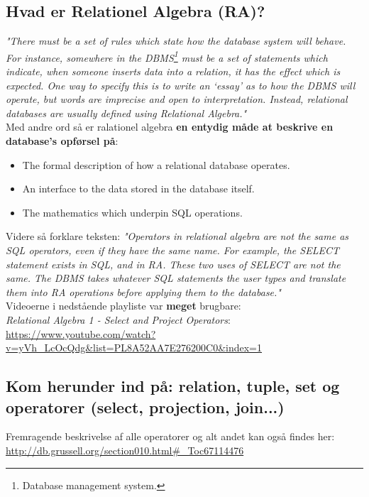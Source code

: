 \newpage

\subsection{Hvad er Relationel Algebra (RA)?}

\textit{"There must be a set of rules which state how the database system will behave. For instance, somewhere in the DBMS\footnote{Database management system.} must be a set of statements which indicate, when someone inserts data into a relation, it has the effect which is expected. One way to specify this is to write an `essay' as to how the DBMS will operate, but words are imprecise and open to interpretation. Instead, relational databases are usually defined using Relational Algebra."}\\

Med andre ord så er ralationel algebra \textbf{en entydig måde at beskrive en database's opførsel på}: 

\begin{itemize}
	\item The formal description of how a relational database operates.
	\item An interface to the data stored in the database itself.
	\item The mathematics which underpin SQL operations.
\end{itemize}

Videre så forklare teksten: \textit{"Operators in relational algebra are not the same as SQL operators, even if they have the same name. For example, the SELECT statement exists in SQL, and in RA. These two uses of SELECT are not the same. The DBMS takes whatever SQL statements the user types and translate them into RA operations before applying them to the database."}\\

Videoerne i nedstående playliste var \textbf{meget} brugbare:\\
\textit{Relational Algebra 1 - Select and Project Operators}:\\
\url{https://www.youtube.com/watch?v=yVh_LcOcQdg&list=PL8A52AA7E276200C0&index=1}

\subsection{Kom herunder ind på: relation, tuple, set og operatorer (select, projection, join...)}

Fremragende beskrivelse af alle operatorer og alt andet kan også findes her: \\
\url{http://db.grussell.org/section010.html#_Toc67114476}


